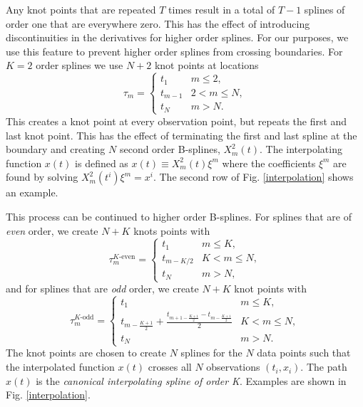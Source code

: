 \documentclass{ametsoc}
\begin{document}
Any knot points that are repeated $T$ times result in a total of $T-1$ splines of order one that are everywhere zero. This has the effect of introducing discontinuities in the derivatives for higher order splines. For our purposes, we use this feature to prevent higher order splines from crossing boundaries. For $K=2$ order splines we use $N+2$ knot points at locations
\begin{equation}
\tau_m = \begin{cases}
t_1      	& \text{$m \leq 2$}, \\
t_{m-1}	& \text{$2 < m \leq N$},\\
t_N 		& \text{$m > N$}.
\end{cases}
\end{equation}
This creates a knot point at every observation point, but repeats the first and last knot point. This has the effect of terminating the first and last spline at the boundary and creating $N$ second order B-splines, $X^2_m(t)$. The interpolating function $x(t)$ is defined as $x(t) \equiv  X^2_m(t) \xi^m$ where the coefficients $\xi^m$ are found by solving $X^2_m(t^i) \xi^m = x^i$. The second row of Fig. \ref{interpolation} shows an example.

This process can be continued to higher order B-splines. For splines that are of \emph{even} order, we create $N+K$ knots points with
\begin{equation}
\tau_m^{\text{$K$-even}} = \begin{cases}
t_1      	& \text{$m \leq K$}, \\
t_{m-K/2}	& \text{$K < m \leq N$},\\
t_N 		& \text{$m > N$},
\end{cases}
\label{even-knots}
\end{equation}
and for splines that are \emph{odd} order, we create $N+K$ knot points with
\begin{equation}
\tau_m^{\text{$K$-odd}} = \begin{cases}
t_1      	& \text{$m \leq K$}, \\
t_{m-\frac{K+1}{2}} + \frac{t_{m+1-\frac{K+1}{2}}-t_{m-\frac{K+1}{2}}}{2}	& \text{$K < m \leq N$},\\
t_N 		& \text{$m > N$}.
\end{cases}
\label{odd-knots}
\end{equation}
The knot points are chosen to create $N$ splines for the $N$ data points such that the interpolated function $x(t)$ crosses all $N$ observations $(t_i,x_i)$. The path $x(t)$ is the \emph{canonical interpolating spline of order K}. Examples are shown in Fig. \ref{interpolation}.
\end{document}
